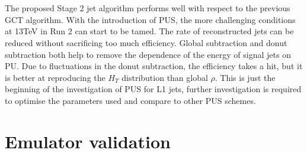\\\\
\noindent The proposed Stage 2 jet algorithm performs well with respect to the previous GCT algorithm. With the introduction of PUS, the more challenging conditions at 13TeV in Run 2 can start to be tamed. The rate of reconstructed jets can be reduced without sacrificing too much efficiency. Global subtraction and donut subtraction both help to remove the dependence of the energy of signal jets on PU. Due to fluctuations in the donut subtraction, the efficiency takes a hit, but it is better at reproducing the $H_T$ distribution than global $\rho$. This is just the beginning of the investigation of PUS for L1 jets, further investigation is required to optimise the parameters used and compare to other PUS schemes.


\section{Emulator validation}
\label{sec:l1jec}



